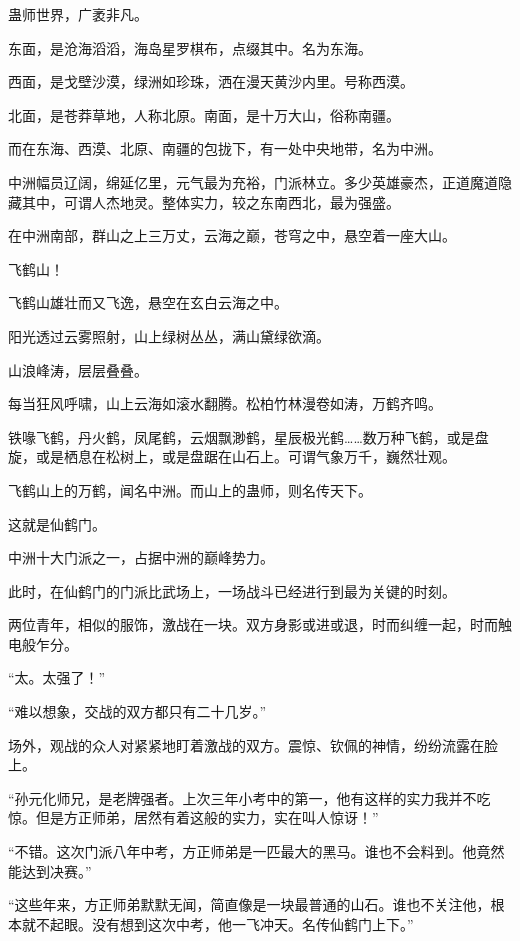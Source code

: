 
\begin{this_body}

蛊师世界，广袤非凡。

东面，是沧海滔滔，海岛星罗棋布，点缀其中。名为东海。

西面，是戈壁沙漠，绿洲如珍珠，洒在漫天黄沙内里。号称西漠。

北面，是苍莽草地，人称北原。南面，是十万大山，俗称南疆。

而在东海、西漠、北原、南疆的包拢下，有一处中央地带，名为中洲。

中洲幅员辽阔，绵延亿里，元气最为充裕，门派林立。多少英雄豪杰，正道魔道隐藏其中，可谓人杰地灵。整体实力，较之东南西北，最为强盛。

在中洲南部，群山之上三万丈，云海之巅，苍穹之中，悬空着一座大山。

飞鹤山！

飞鹤山雄壮而又飞逸，悬空在玄白云海之中。

阳光透过云雾照射，山上绿树丛丛，满山黛绿欲滴。

山浪峰涛，层层叠叠。

每当狂风呼啸，山上云海如滚水翻腾。松柏竹林漫卷如涛，万鹤齐鸣。

铁喙飞鹤，丹火鹤，凤尾鹤，云烟飘渺鹤，星辰极光鹤……数万种飞鹤，或是盘旋，或是栖息在松树上，或是盘踞在山石上。可谓气象万千，巍然壮观。

飞鹤山上的万鹤，闻名中洲。而山上的蛊师，则名传天下。

这就是仙鹤门。

中洲十大门派之一，占据中洲的巅峰势力。

此时，在仙鹤门的门派比武场上，一场战斗已经进行到最为关键的时刻。

两位青年，相似的服饰，激战在一块。双方身影或进或退，时而纠缠一起，时而触电般乍分。

“太。太强了！”

“难以想象，交战的双方都只有二十几岁。”

场外，观战的众人对紧紧地盯着激战的双方。震惊、钦佩的神情，纷纷流露在脸上。

“孙元化师兄，是老牌强者。上次三年小考中的第一，他有这样的实力我并不吃惊。但是方正师弟，居然有着这般的实力，实在叫人惊讶！”

“不错。这次门派八年中考，方正师弟是一匹最大的黑马。谁也不会料到。他竟然能达到决赛。”

“这些年来，方正师弟默默无闻，简直像是一块最普通的山石。谁也不关注他，根本就不起眼。没有想到这次中考，他一飞冲天。名传仙鹤门上下。”


\end{this_body}
